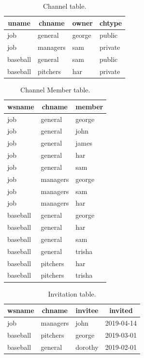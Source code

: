 \documentclass{article}
\begin{document}
\begin{table}[!p]
\centering
\begin{tabular}{l l l l}
\toprule
\multicolumn{1}{c}{uname} &
\multicolumn{1}{c}{chname} &
\multicolumn{1}{c}{owner} &
\multicolumn{1}{c}{chtype} \\
\midrule
job & general & george & public \\
job & managers & sam & private \\
\midrule
baseball & general & sam & public \\
baseball & pitchers & har  & private \\
\bottomrule
\end{tabular}
\caption{Channel table.}
\label{tbl:channel}
\end{table}

\begin{table}[!p]
\centering
\begin{tabular}{l l l}
\toprule
\multicolumn{1}{c}{wsname} &
\multicolumn{1}{c}{chname} &
\multicolumn{1}{c}{member} \\
\midrule
job & general & george \\
job & general & john   \\
job & general & james  \\
job & general & har    \\
job & general & sam    \\
\midrule
job & managers & george \\
job & managers & sam   \\
job & managers & har   \\
\midrule
baseball & general & george  \\
baseball & general & har     \\
baseball & general & sam     \\
baseball & general & trisha  \\
\midrule
baseball & pitchers & har \\
baseball & pitchers & trisha \\
\bottomrule
\end{tabular}
\caption{Channel Member table.}
\label{tbl:chmember}
\end{table}

\begin{table}[!p]
\centering
\begin{tabular}{l l l l}
\toprule
\multicolumn{1}{c}{wsname} &
\multicolumn{1}{c}{chname} &
\multicolumn{1}{c}{invitee} &
\multicolumn{1}{c}{invited} \\
\midrule
job & managers & john & 2019-04-14 \\
baseball & pitchers & george & 2019-03-01 \\
baseball & general & dorothy & 2019-02-01 \\
\bottomrule
\end{tabular}
\caption{Invitation table.}
\label{tbl:invitation}
\end{table}
\end{document}
